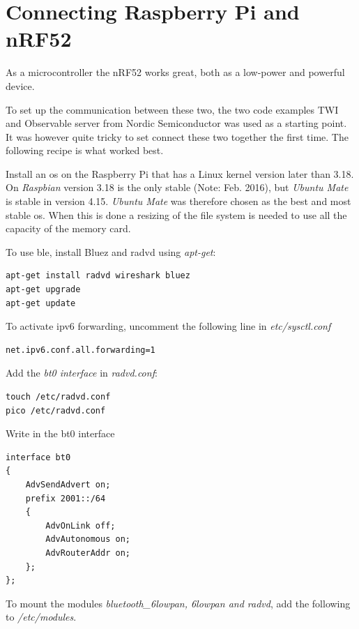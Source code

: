 \section{Connecting Raspberry Pi and nRF52}



As a microcontroller the nRF52 works great, both as a low-power and powerful device. 

To set up the communication between these two, the two code examples TWI and Observable server from Nordic Semiconductor was used as a starting point. It was however quite tricky to set connect these two together the first time. The following recipe is what worked best. 

Install an \gls{os} on the Raspberry Pi that has a Linux kernel version later than 3.18. On \textit{Raspbian} version 3.18 is the only stable (Note: Feb. 2016), but \textit{Ubuntu Mate} is stable in version 4.15. \textit{Ubuntu Mate} was therefore chosen as the best and most stable \gls{os}. When this is done a resizing of the file system is needed to use all the capacity of the memory card. 

To use \gls{ble}, install Bluez and radvd using \textit{apt-get}:

\begin{lstlisting}
apt-get install radvd wireshark bluez
apt-get upgrade
apt-get update
\end{lstlisting}

To activate \gls{ipv6} forwarding, uncomment the following line in \textit{etc/sysctl.conf}

\begin{verbatim}
net.ipv6.conf.all.forwarding=1
\end{verbatim}

Add the \textit{bt0 interface} in \textit{radvd.conf}:

\begin{verbatim}
touch /etc/radvd.conf
pico /etc/radvd.conf
\end{verbatim} 

Write in the bt0 interface

\begin{verbatim}
interface bt0
{
    AdvSendAdvert on;
    prefix 2001::/64
    {
        AdvOnLink off;
        AdvAutonomous on;
        AdvRouterAddr on;
    };
};
\end{verbatim} 

To mount the modules \textit{bluetooth\_6lowpan, 6lowpan and radvd}, add the following to \textit{/etc/modules}. 

